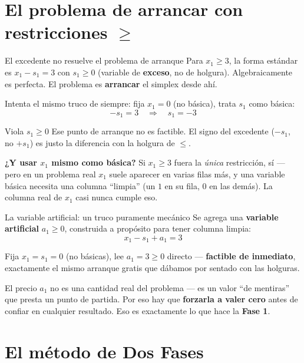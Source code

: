 \documentclass[aspectratio=169]{beamer}
\begin{document}
\section{El problema de arrancar con restricciones $\geq$}

\begin{frame}{El excedente no resuelve el problema de arranque}
Para $x_1\geq3$, la forma estándar es $x_1-s_1=3$ con $s_1\geq0$ (variable de \textbf{exceso}, no de holgura). Algebraicamente es perfecta. El problema es \textbf{arrancar} el simplex desde ahí.

Intenta el mismo truco de siempre: fija $x_1=0$ (no básica), trata $s_1$ como básica:
\[
-s_1=3 \quad\Rightarrow\quad s_1=-3
\]

\begin{alertblock}{Viola $s_1\geq0$}
Ese punto de arranque no es factible. El signo del excedente ($-s_1$, no $+s_1$) es justo la diferencia con la holgura de $\leq$.
\end{alertblock}

\textbf{¿Y usar $x_1$ mismo como básica?} Si $x_1\geq3$ fuera la \emph{única} restricción, sí --- pero en un problema real $x_1$ suele aparecer en varias filas más, y una variable básica necesita una columna ``limpia'' (un $1$ en su fila, $0$ en las demás). La columna real de $x_1$ casi nunca cumple eso.
\end{frame}

\begin{frame}{La variable artificial: un truco puramente mecánico}
Se agrega una \textbf{variable artificial} $a_1\geq0$, construida a propósito para tener columna limpia:
\[
x_1-s_1+a_1=3
\]

Fija $x_1=s_1=0$ (no básicas), lee $a_1=3\geq0$ directo --- \textbf{factible de inmediato}, exactamente el mismo arranque gratis que dábamos por sentado con las holguras.

\begin{block}{El precio}
$a_1$ no es una cantidad real del problema --- es un valor ``de mentiras'' que presta un punto de partida. Por eso hay que \textbf{forzarla a valer cero} antes de confiar en cualquier resultado. Eso es exactamente lo que hace la \textbf{Fase 1}.
\end{block}
\end{frame}

\section{El método de Dos Fases}
\end{document}
